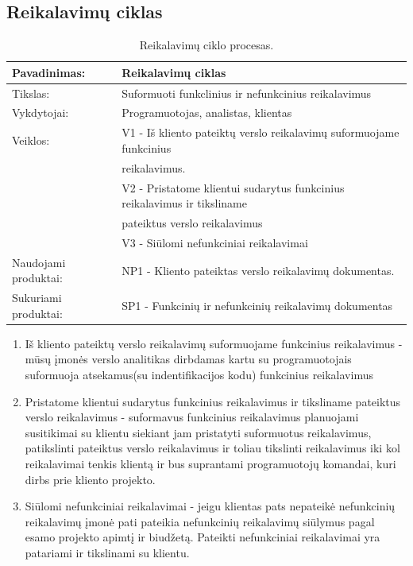 \documentclass{VUMIFPSkursinis}
\begin{document}
	\subsection{Reikalavimų ciklas}
		\begin{center}
			\begin{table}[ht]
				\caption{Reikalavimų ciklo procesas.}
					\begin{tabular}{ | l | l | } 
						\hline
							Pavadinimas:         & Reikalavimų ciklas                                      \\ \hline
							Tikslas: 	           & Suformuoti funkclinius ir nefunkcinius reikalavimus							\\ \hline
							Vykdytojai:          & Programuotojas, analistas, klientas                            \\ \hline
							Veiklos:             & V1 - Iš kliento pateiktų verslo reikalavimų suformuojame funkcinius \\ & reikalavimus. 													\\
											 & V2 - Pristatome klientui sudarytus funkcinius reikalavimus ir tiksliname \\& pateiktus verslo reikalavimus \\
											 & V3 - Siūlomi nefunkciniai reikalavimai												\\ \hline
							Naudojami produktai: & NP1 - Kliento pateiktas verslo reikalavimų dokumentas.													 \\ \hline
							Sukuriami produktai: & SP1 - Funkcinių ir nefunkcinių reikalavimų dokumentas								\\ \hline
					\end{tabular}
			\end{table}
		\end{center}

\begin{enumerate}
	\item{Iš kliento pateiktų verslo reikalavimų suformuojame funkcinius reikalavimus - mūsų įmonės verslo analitikas dirbdamas kartu su programuotojais suformuoja atsekamus(su indentifikacijos kodu) funkcinius reikalavimus}
	\item{Pristatome klientui sudarytus funkcinius reikalavimus ir tiksliname pateiktus verslo reikalavimus - suformavus funkcinius reikalavimus planuojami susitikimai su klientu siekiant jam pristatyti suformuotus reikalavimus, patikslinti pateiktus verslo reikalavimus ir toliau tikslinti reikalavimus iki kol reikalavimai tenkis klientą ir bus suprantami programuotojų komandai, kuri dirbs prie kliento projekto.}
	\item{Siūlomi nefunkciniai reikalavimai - jeigu klientas pats nepateikė nefunkcinių reikalavimų įmonė pati pateikia nefunkcinių reikalavimų siūlymus pagal esamo projekto apimtį ir biudžetą. Pateikti nefunkciniai reikalavimai yra patariami ir tikslinami su klientu.}
\end{enumerate}
		
\end{document}
